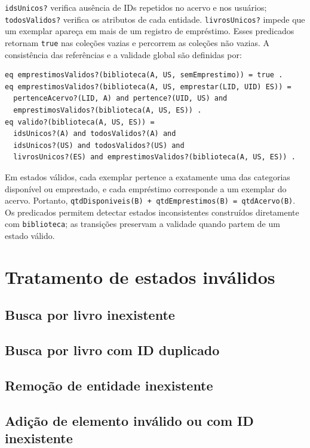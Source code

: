 \documentclass[a4paper,12pt]{article}
\begin{document}
\texttt{idsUnicos?} verifica ausência de IDs repetidos no acervo e nos usuários;
\texttt{todosValidos?} verifica os atributos de cada entidade.
\texttt{livrosUnicos?} impede que um exemplar apareça em mais de um registro
de empréstimo. Esses predicados retornam \texttt{true} nas coleções vazias e
percorrem as coleções não vazias. A consistência das referências e a validade
global são definidas por:
\begin{lstlisting}
eq emprestimosValidos?(biblioteca(A, US, semEmprestimo)) = true .
eq emprestimosValidos?(biblioteca(A, US, emprestar(LID, UID) ES)) =
  pertenceAcervo?(LID, A) and pertence?(UID, US) and
  emprestimosValidos?(biblioteca(A, US, ES)) .
eq valido?(biblioteca(A, US, ES)) =
  idsUnicos?(A) and todosValidos?(A) and
  idsUnicos?(US) and todosValidos?(US) and
  livrosUnicos?(ES) and emprestimosValidos?(biblioteca(A, US, ES)) .
\end{lstlisting}

Em estados válidos, cada exemplar pertence a exatamente uma das categorias
disponível ou emprestado, e cada empréstimo corresponde a um exemplar do
acervo. Portanto, \texttt{qtdDisponiveis(\allowbreak{}B) + qtdEmprestimos(\allowbreak{}B) = qtdAcervo(\allowbreak{}B)}.
Os predicados permitem detectar estados inconsistentes construídos diretamente
com \texttt{biblioteca}; as transições preservam a validade quando partem de
um estado válido.

\section{Tratamento de estados inválidos}

\subsection{Busca por livro inexistente}

\subsection{Busca por livro com ID duplicado}

\subsection{Remoção de entidade inexistente}

\subsection{Adição de elemento inválido ou com ID inexistente}
\end{document}
